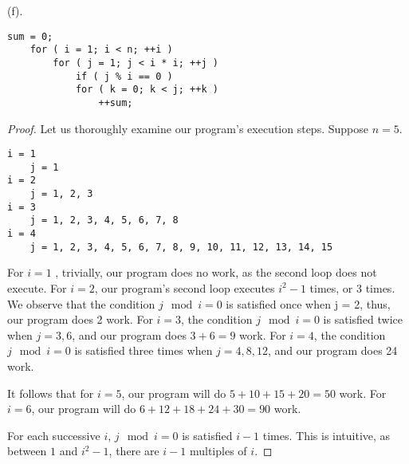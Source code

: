 \documentclass{article}
\begin{document}
(f).
\begin{verbatim}
sum = 0;
    for ( i = 1; i < n; ++i )
        for ( j = 1; j < i * i; ++j )
            if ( j % i == 0 )
            for ( k = 0; k < j; ++k )
                ++sum;
\end{verbatim} 
\begin{proof}
Let us thoroughly examine our program's execution steps. Suppose $n = 5$.
\begin{verbatim}
i = 1
    j = 1
i = 2
    j = 1, 2, 3
i = 3
    j = 1, 2, 3, 4, 5, 6, 7, 8
i = 4
    j = 1, 2, 3, 4, 5, 6, 7, 8, 9, 10, 11, 12, 13, 14, 15
\end{verbatim}

For $i = 1$ , trivially, our program does no work, as the second loop does not execute. For $i = 2$, our program's second loop executes $i^{2}-1 $ times, or 3 times. We observe that the condition $j \mod i = 0$ is satisfied once when j = 2, thus, our program does 2 work. For $i = 3$, the condition $j \mod i = 0$ is satisfied twice when $j = 3, 6$, and our program does $3 + 6 = 9$ work. For $i = 4$, the condition $j \mod i = 0$ is satisfied three times when $j = 4, 8, 12$, and our program does 24 work.

\vspace{5mm}

It follows that for $i = 5$, our program will do $5 + 10 + 15 + 20 = 50$ work. For $i = 6$, our program will do $6 + 12 + 18 + 24 + 30 = 90$ work.

\vspace{5mm}

For each successive $i$, $j \mod i = 0$ is satisfied $i-1$ times. This is intuitive, as between $1$ and $i^{2} - 1$, there are $i-1$ multiples of $i$.

\vspace{5mm}


\end{proof}
\end{document}

